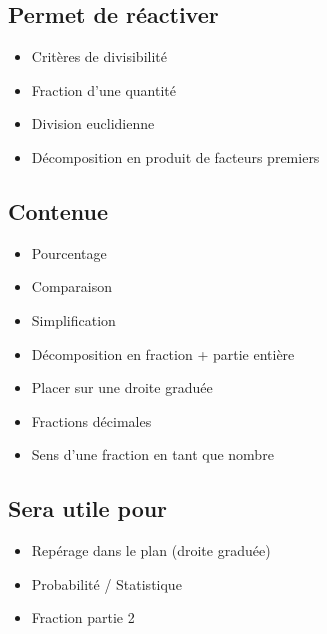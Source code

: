 \subsection{Permet de réactiver}
\begin{itemize}
    \item Critères de divisibilité
    \item Fraction d'une quantité
    \item Division euclidienne
    \item Décomposition en produit de facteurs premiers
\end{itemize}

\subsection{Contenue}
\begin{itemize}
    \item Pourcentage
    \item Comparaison
    \item Simplification
    \item Décomposition en fraction + partie entière
    \item Placer sur une droite graduée
    \item Fractions décimales
    \item Sens d'une fraction en tant que nombre
\end{itemize}

\subsection{Sera utile pour}
\begin{itemize}
    \item Repérage dans le plan (droite graduée)
    \item Probabilité / Statistique
    \item Fraction partie 2
\end{itemize}